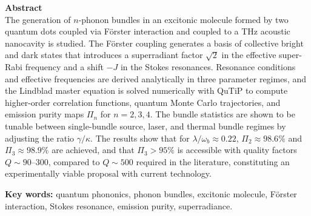 \textbf{\LARGE Abstract}\\

The generation of $n$-phonon bundles in an excitonic molecule formed by two quantum dots coupled via Förster interaction and coupled to a THz acoustic nanocavity is studied. The Förster coupling generates a basis of collective bright and dark states that introduces a superradiant factor $\sqrt{2}$ in the effective super-Rabi
frequency and a shift $-J$ in the Stokes resonances. Resonance conditions and effective frequencies are derived analytically in three parameter regimes, and the Lindblad master equation is solved numerically with QuTiP to compute higher-order correlation functions, quantum Monte Carlo trajectories, and emission purity maps $\Pi_n$ for $n=2,3,4$. The bundle statistics are shown to be tunable between single-bundle source, laser, and thermal bundle regimes by adjusting the ratio $\gamma/\kappa$. The results show that for $\lambda/\omega_b \approx 0.22$, $\Pi_2 \approx 98.6\%$ and $\Pi_3 \approx 98.9\%$ are achieved, and that $\Pi_3 > 95\%$ is accessible with quality factors $Q \sim 90$--$300$, compared to $Q \sim 500$ required in the literature, constituting an experimentally viable proposal with current technology.

\vspace{0.5cm}
\textbf{\small Key words: } quantum phononics, phonon bundles, excitonic molecule, Förster interaction, Stokes resonance, emission purity, superradiance.